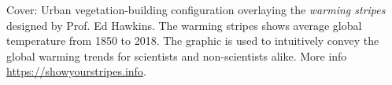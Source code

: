 \thispagestyle{empty}

\hfill

\vfill

\noindent Cover: Urban vegetation-building configuration overlaying the \textit{warming stripes} designed by Prof. Ed Hawkins. The warming stripes shows average global temperature from 1850 to 2018. The graphic is used to intuitively convey the global warming trends for scientists and non-scientists alike. More info \url{https://showyourstripes.info}.\\

\bigskip


%
%

%
%
%
%
%
